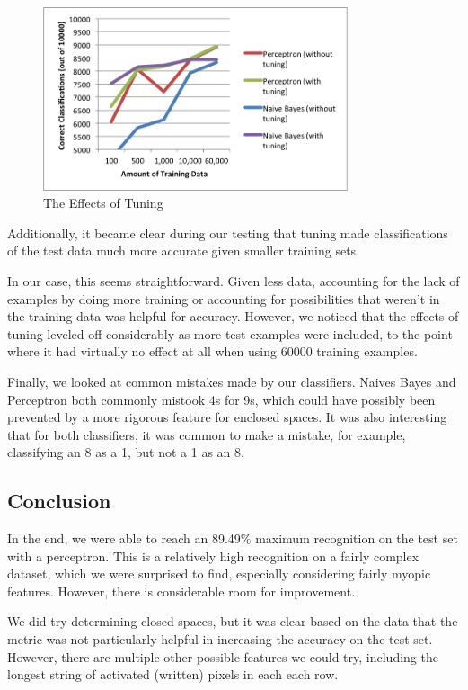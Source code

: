 \documentclass{article}
\theoremstyle{remark}
\begin{document}
    \begin{figure}[h!]
      \centering
      \includegraphics[width=0.8\textwidth]{../graphs/tuning.png}
      \caption{The Effects of Tuning}
    \end{figure}
    \newpage
    Additionally, it became clear during our testing that tuning made classifications of the test data much more accurate given smaller training sets.

    In our case, this seems straightforward. Given less data, accounting for the lack of examples by doing more training or accounting for possibilities that weren't in the training data was helpful for accuracy. However, we noticed that the effects of tuning leveled off considerably as more test examples were included, to the point where it had virtually no effect at all when using 60000 training examples.

    Finally, we looked at common mistakes made by our classifiers. Naives Bayes and Perceptron both commonly mistook 4s for 9s, which could have possibly been prevented by a more rigorous feature for enclosed spaces. It was also interesting that for both classifiers, it was common to make a mistake, for example, classifying an 8 as a 1, but not a 1 as an 8.
\newpage
     \subsection*{Conclusion}
     In the end, we were able to reach an 89.49\% maximum recognition on the test set with a perceptron. This is a relatively high recognition on a fairly complex dataset, which we were surprised to find, especially considering fairly myopic features. However, there is considerable room for improvement.

     We did try determining closed spaces, but it was clear based on the data that the metric was not particularly helpful in increasing the accuracy on the test set. However, there are multiple other possible features we could try, including the longest string of activated (written) pixels in each each row.
\end{document}
